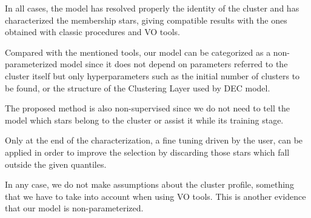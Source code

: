 \documentclass[11pt,a4paper,english,twocolumn]{article}
\begin{document}
\begin{table}[htbp]
  \begin{center}
    \caption{Righ ascension, declination, radius and number of stars of studied clusters.
             The number of stars corresponds to those stars contained within a cone of center
             $(\alpha, \delta)$ and raius the cluster's radius multiplied by a factor of 1.5.}
    \label{tab:clusters_summary}
  \end{center}
\end{table}

In all cases, the model has resolved properly the identity of the cluster
and has characterized the membership stars, giving compatible results
with the ones obtained with classic procedures and VO tools.

Compared with the mentioned tools, our model can be categorized as a
non-parameterized model since it does not depend on parameters referred
to the cluster itself but only hyperparameters such as the initial number
of clusters to be found, or the structure of the Clustering Layer used by DEC model.

The proposed method is also non-supervised since we do not need to tell the model
which stars belong to the cluster or assist it while its training stage.

Only at the end of the characterization, a fine tuning driven by the user,
can be applied in order to improve the selection by discarding those
stars which fall outside the given quantiles.

In any case, we do not make assumptions about the cluster profile,
something that we have to take into account when using VO tools.
This is another evidence that our model is non-parameterized.
\end{document}
